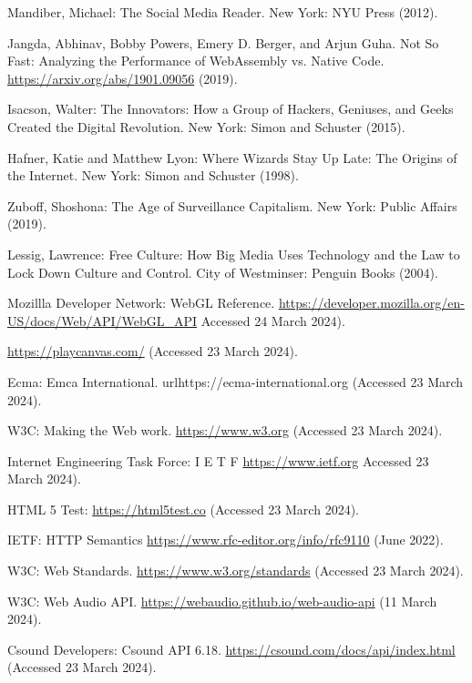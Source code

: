 \documentclass[runningheads,a4paper]{llncs}
\begin{document}
\begin{thebibliography}{4}

 Mandiber, Michael: The Social Media Reader. New York: NYU Press (2012).

 Jangda, Abhinav, Bobby Powers, Emery D. Berger, and Arjun Guha. Not So Fast: Analyzing the Performance of WebAssembly vs. Native Code. \url{https://arxiv.org/abs/1901.09056} (2019).

 Isacson, Walter: The Innovators: How a Group of Hackers, Geniuses, and Geeks Created the Digital Revolution. New York: Simon and Schuster (2015).

 Hafner, Katie and Matthew Lyon: Where Wizards Stay Up Late: The Origins of the Internet. New York: Simon and Schuster (1998).

 Zuboff, Shoshona: The Age of Surveillance Capitalism. New York: Public Affairs (2019).

 Lessig, Lawrence: Free Culture: How Big Media Uses Technology and the Law to Lock Down Culture and Control. City of Westminser: Penguin Books (2004).

 Mozillla Developer Network: WebGL Reference. \url{https://developer.mozilla.org/en-US/docs/Web/API/WebGL_API} Accessed 24 March 2024).

 \url{https://playcanvas.com/} (Accessed 23 March 2024).

 Ecma: Emca International. url{https://ecma-international.org} (Accessed 23 March 2024).

 W3C: Making the Web work. \url{https://www.w3.org} (Accessed 23 March 2024).

 Internet Engineering Task Force: I E T F \url{https://www.ietf.org} Accessed 23 March 2024).

 HTML 5 Test: \url{https://html5test.co} (Accessed 23 March 2024).

 IETF: HTTP Semantics \url{https://www.rfc-editor.org/info/rfc9110} (June 2022).

 W3C: Web Standards. \url{https://www.w3.org/standards} (Accessed 23 March 2024).

 W3C: Web Audio API. \url{https://webaudio.github.io/web-audio-api} (11 March 2024).

 Csound Developers: Csound API 6.18. \url{https://csound.com/docs/api/index.html} (Accessed 23 March 2024).


\end{thebibliography}
\end{document}
